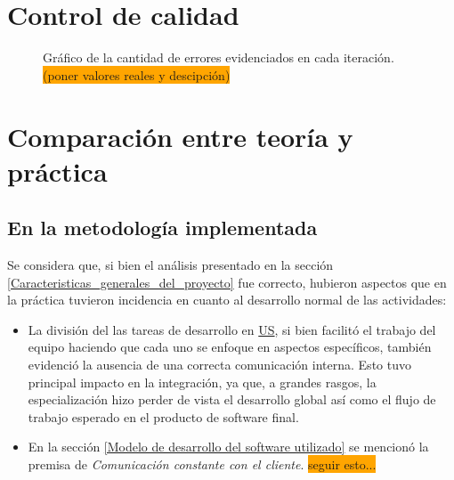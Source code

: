 \documentclass[a4paper, 12pt,twoside]{report}  %
\numberwithin{equation}{subsection} %
\begin{document}
\chapter{Control de calidad}

\begin{figure}[H]
	\centering
	\caption{Gráfico de la cantidad de errores evidenciados en cada iteración.\newline\colorbox{orange}{(poner valores reales y descipción)}}
	\label{grafico_errores_iteracion}
\end{figure}


\chapter{Comparación entre teoría y práctica}

\section{En la metodología implementada}
Se considera que, si bien el análisis presentado en la sección \ref{Caracteristicas_generales_del_proyecto} fue correcto, hubieron aspectos que en la práctica tuvieron incidencia en cuanto al desarrollo normal de las actividades:
\begin{itemize}
	\item La división del las tareas de desarrollo en \hyperlink{US}{US}, si bien facilitó el trabajo del equipo haciendo que cada uno se enfoque en aspectos específicos, también evidenció la ausencia de una correcta comunicación interna. Esto tuvo principal impacto en la integración, ya que, a grandes rasgos, la especialización hizo perder de vista el desarrollo global así como el flujo de trabajo esperado en el producto de software final.
	\item En la sección \ref{Modelo de desarrollo del software utilizado} se mencionó la premisa de \textit{Comunicación constante con el cliente}. \colorbox{orange}{seguir esto...}
\end{itemize}
\end{document}
